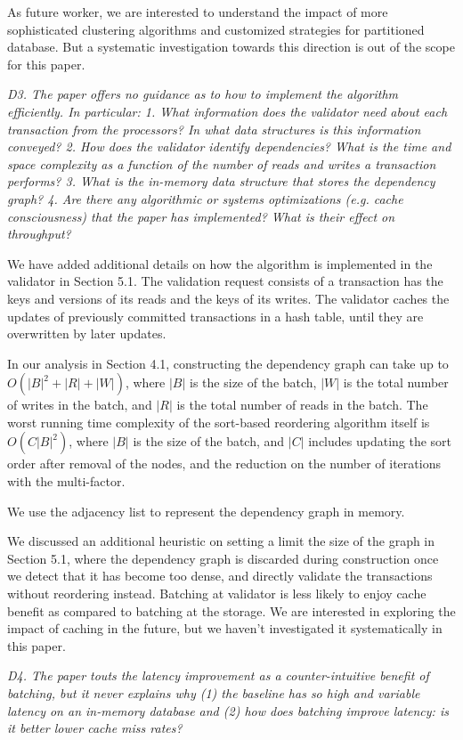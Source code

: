 \documentclass{article}
\begin{document}
As future worker, we are interested to understand the impact of more sophisticated clustering algorithms and customized strategies for partitioned database. But a systematic investigation towards this direction is out of the scope for this paper.

\emph{D3. The paper offers no guidance as to how to implement the algorithm efficiently. In particular:
	1. What information does the validator need about each transaction from the processors? In what data structures is this information conveyed?
	2. How does the validator identify dependencies? What is the time and space complexity as a function of the number of reads and writes a transaction performs?
	3. What is the in-memory data structure that stores the dependency graph? 
	4. Are there any algorithmic or systems optimizations (e.g. cache consciousness) that the paper has implemented? What is their effect on throughput?}

We have added additional details on how the algorithm is implemented in the validator in Section 5.1. The validation request consists of a transaction has the keys and versions of its reads and the keys of its writes. The validator caches the updates of previously committed transactions in a hash table, until they are overwritten by later updates. 

In our analysis in Section 4.1, constructing the dependency graph can take up to $O(|B|^2+|R|+|W|)$, where $|B|$ is the size of the batch, $|W|$ is the total number of writes in the batch, and $|R|$ is the total number of reads in the batch. The worst running time complexity of the sort-based reordering algorithm itself is $O(C|B|^2)$, where $|B|$ is the size of the batch, and $|C|$ includes updating the sort order after removal of the nodes, and the reduction on the number of iterations with the multi-factor. 

We use the adjacency list to represent the dependency graph in memory. 

We discussed an additional heuristic on setting a  limit the size of the graph in Section 5.1, where the dependency graph is discarded during construction once we detect that it has become too dense, and directly validate the transactions without reordering instead. Batching at validator is less likely to enjoy cache benefit as compared to batching at the storage. We are interested in exploring the impact of caching in the future, but we haven't investigated it systematically in this paper.

\emph{D4. The paper touts the latency improvement as a counter-intuitive benefit of batching, but it never explains why (1) the baseline has so high and variable latency on an in-memory database and (2) how does batching improve latency: is it better lower cache miss rates?}
\end{document}
